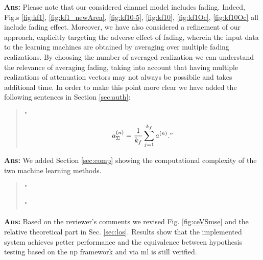 \documentclass[draftcls,onecolumn,12pt]{IEEEtran}
\newcounter{revc}
\newcommand{\revp}[1]{\zref[revcontent]{#1}}
\begin{document}
{\bf Ans:} Please note that our considered channel model includes fading. Indeed, Fig.s \ref{fig:kf1}, \ref{fig:kf1_newArea}, \ref{fig:kf10-5}, \ref{fig:kf10}, \ref{fig:kf1Oc}, \ref{fig:kf10Oc} all include fading effect. Moreover, we have also considered a refinement of our approach, explicitly targeting the adverse effect of fading, wherein the input data to the learning machines are obtained by averaging over multiple fading realizations. By choosing the number of averaged realization we can understand the relevance of averaging fading, taking into account that having multiple realizations of attenuation vectors may not always be possibile and takes additional time. In order to make this point more clear we have added the following sentences in Section \ref{sec:auth}:
\begin{quote}
    "\revp{avg_1}
$$
a^{(n)}_{\Sigma} = \frac{1}{k_f}\sum_{j=1}^{k_f} a^{(n)}."
$$
\end{quote}


\vspace{5mm} %
\begin{framed}
\end{framed}

{\bf Ans:} We added Section \ref{sec:comp} showing the computational complexity of the two machine learning methods.

\begin{quote}
"\revp{comp1} 

\revp{comp2}

\revp{comp3}"
\end{quote}

\vspace{5mm} %
\begin{framed}
\end{framed}

{\bf Ans:} Based on the reviewer's comments we revised Fig. \ref{fig:ceVSmse} and the relative theoretical part in Sec. \ref{sec:los}. Results show that the implemented system achieves petter performance and the equivalence between hypothesis testing based on the \ac{np} framework and via \ac{ml} is still verified.
\end{document}
